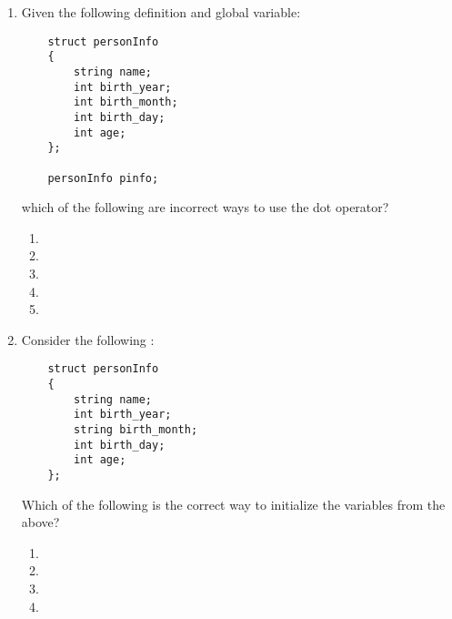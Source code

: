 \begin{enumerate}
\item Given the following  definition and global variable:

\begin{lstlisting}
	struct personInfo
	{
		string name;
		int birth_year;
		int birth_month;
		int birth_day;
		int age;
	};

	personInfo pinfo;
\end{lstlisting}

\noindent which of the following are incorrect ways to use the dot operator?
  \begin{enumerate}
	\item {}
	\item {}
	\item {}
  \item {}
	\item {}
  \end{enumerate}

\item Consider the following :

\begin{lstlisting}
	struct personInfo
	{
		string name;
		int birth_year;
		string birth_month;
		int birth_day;
		int age;
	};
\end{lstlisting}

Which of the following is the correct way to initialize the variables from the  above?

  \begin{enumerate}
	\item {}
	\item {}
	\item {}
	\item {}
  \end{enumerate}
\end{enumerate}


